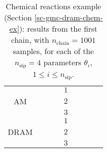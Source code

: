 \begin{table}[h!]
\begin{center}
\begin{tabular}{|c|c|c|c|c|c|c|c|c|}
\hline
\hline
       &          &                        &                        & $1$ &                          &                                &                        &                               \\
\cline{5-9}
AM     &          &                        &                        & $2$ &                          &                                &                        &                               \\
\cline{5-9}
       &          &                        &                        & $3$ &                          &                                &                        &                               \\
\hline
\hline
       &          &                        &                        & $1$ &                          &                                &                        &                               \\
\cline{5-9}
DRAM   &          &                        &                        & $2$ &                          &                                &                        &                               \\
\cline{5-9}
       &          &                        &                        & $3$ &                          &                                &                        &                               \\
\hline
\end{tabular}
\caption{Chemical reactions example (Section \ref{sc-gmc-dram-chem-ex}):
results from the first chain, with $n_{\text{chain}}=1001$ samples,
for each of the $n_{\text{sip}}=4$ parameters $\theta_i$, $1\leqslant i\leqslant n_{\text{sip}}$.
}
\label{tab-dram-chem-ex-results-1}
\end{center}
\end{table}

